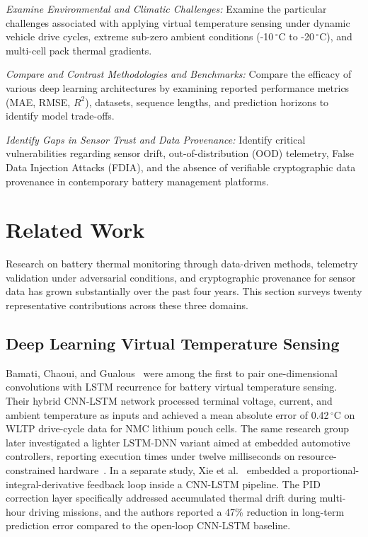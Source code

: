 \documentclass[conference]{IEEEtran}
\begin{document}
\textit{Examine Environmental and Climatic Challenges:} Examine the particular challenges associated with applying virtual temperature sensing under dynamic vehicle drive cycles, extreme sub-zero ambient conditions (-10\,$^\circ$C to -20\,$^\circ$C), and multi-cell pack thermal gradients.

\textit{Compare and Contrast Methodologies and Benchmarks:} Compare the efficacy of various deep learning architectures by examining reported performance metrics (MAE, RMSE, $R^2$), datasets, sequence lengths, and prediction horizons to identify model trade-offs.

\textit{Identify Gaps in Sensor Trust and Data Provenance:} Identify critical vulnerabilities regarding sensor drift, out-of-distribution (OOD) telemetry, False Data Injection Attacks (FDIA), and the absence of verifiable cryptographic data provenance in contemporary battery management platforms.

\section{Related Work}
Research on battery thermal monitoring through data-driven methods, telemetry validation under adversarial conditions, and cryptographic provenance for sensor data has grown substantially over the past four years. This section surveys twenty representative contributions across these three domains.

\subsection{Deep Learning Virtual Temperature Sensing}

Bamati, Chaoui, and Gualous~\cite{bamati2024enhancing} were among the first to pair one-dimensional convolutions with LSTM recurrence for battery virtual temperature sensing. Their hybrid CNN-LSTM network processed terminal voltage, current, and ambient temperature as inputs and achieved a mean absolute error of 0.42\,$^\circ$C on WLTP drive-cycle data for NMC lithium pouch cells. The same research group later investigated a lighter LSTM-DNN variant aimed at embedded automotive controllers, reporting execution times under twelve milliseconds on resource-constrained hardware~\cite{bamati2023virtual}. In a separate study, Xie et al.~\cite{xie2023pid} embedded a proportional-integral-derivative feedback loop inside a CNN-LSTM pipeline. The PID correction layer specifically addressed accumulated thermal drift during multi-hour driving missions, and the authors reported a 47\% reduction in long-term prediction error compared to the open-loop CNN-LSTM baseline.
\end{document}
